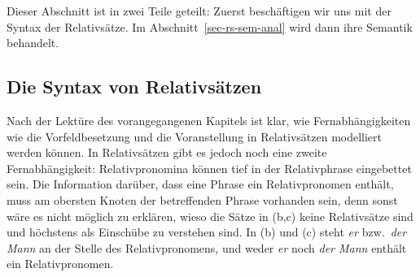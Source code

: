 Dieser Abschnitt ist in zwei Teile geteilt: Zuerst beschäftigen wir uns
mit der Syntax der Relativsätze. Im Abschnitt~\ref{sec-rs-sem-anal} wird dann ihre Semantik
behandelt.

\subsection{Die Syntax von Relativsätzen}
\label{sec-syntax-rs}
\label{lp-rs}%

Nach der Lektüre des vorangegangenen Kapitels ist klar, wie Fernabhängigkeiten wie \zb die
Vorfeldbesetzung und die Voranstellung in Relativsätzen modelliert werden können. In Relativsätzen gibt
es jedoch noch eine zweite Fernabhängigkeit: Relativpronomina können tief in der Relativphrase
eingebettet sein. Die Information darüber, dass eine Phrase ein Relativpronomen enthält, muss
am obersten Knoten der betreffenden Phrase vorhanden sein, denn sonst wäre es nicht möglich zu erklären,
wieso die Sätze in (b,c) keine Relativsätze sind und höchstens als Einschübe zu verstehen sind.
\eal
{}
\zl
In (b) und (c) steht \emph{er} bzw.\ \emph{der Mann} an der Stelle des
Relativpronomens, und weder \emph{er} noch \emph{der Mann} enthält ein Relativpronomen.

